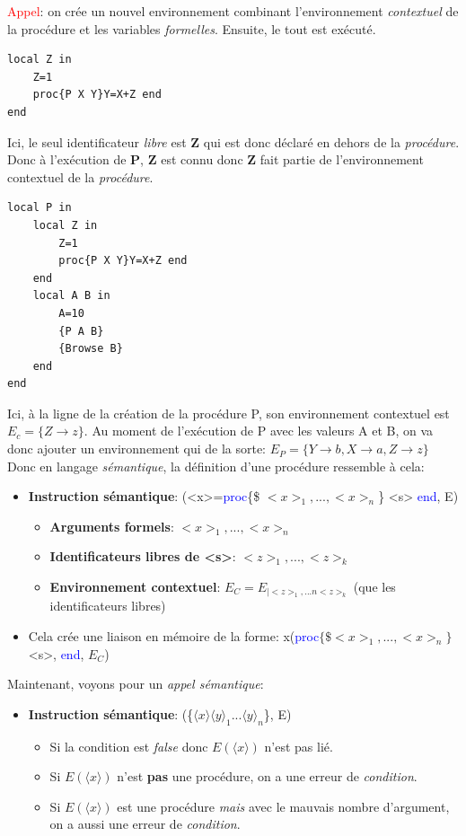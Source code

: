 \documentclass{report}
\begin{document}
\textcolor{red}{Appel}: on crée un nouvel environnement combinant l'environnement \textit{contextuel} de la procédure et les variables \textit{formelles}. Ensuite, le tout est exécuté.
\begin{lstlisting}
local Z in 
	Z=1
	proc{P X Y}Y=X+Z end
end
\end{lstlisting}
Ici, le seul identificateur \textit{libre} est \textbf{Z} qui est donc déclaré en dehors de la \textit{procédure}. Donc à l'exécution de \textbf{P}, \textbf{Z} est connu donc \textbf{Z} fait partie de l'environnement contextuel de la \textit{procédure}.
\begin{lstlisting}
local P in
	local Z in 
		Z=1
		proc{P X Y}Y=X+Z end
	end
	local A B in
		A=10
		{P A B}
		{Browse B}
	end
end 
\end{lstlisting}
Ici, à la ligne de la création de la procédure P, son environnement contextuel est $E_c = \{Z \rightarrow z\}$. Au moment de l'exécution de P avec les valeurs A et B, on va donc ajouter un environnement qui de la sorte: $E_P = \{Y \rightarrow b, X \rightarrow a, Z \rightarrow z\}$
Donc en langage \textit{sémantique}, la définition d'une procédure ressemble à cela:
\begin{itemize}
\item \textbf{Instruction sémantique}: (<x>=\textcolor{blue}{proc}\{\$ $<x>_1, ..., <x>_n$\} <s> \textcolor{blue}{end}, E)
\begin{itemize}
\item \textbf{Arguments formels}: $<x>_1, ..., <x>_n$
\item \textbf{Identificateurs libres de <s>}: $<z>_1, ..., <z>_k$
\item \textbf{Environnement contextuel}: $E_C = E_{|<z>_1, ...n <z>_k}$ (que les identificateurs libres)
\end{itemize}
\item Cela crée une liaison en mémoire de la forme: x(\textcolor{blue}{proc}$\{\$<x>_1, ..., <x>_n\}$<s>, \textcolor{blue}{end}, $E_C$)
\end{itemize}
Maintenant, voyons pour un \textit{appel sémantique}:
\begin{itemize}
\item \textbf{Instruction sémantique}: (\{$\langle x \rangle \langle y \rangle_1 ... \langle y \rangle_n$\}, E)
\begin{itemize}
\item Si la condition est \textit{false} donc $E(\langle x \rangle)$ n'est pas lié.
\item Si $E(\langle x \rangle)$ n'est \textbf{pas} une procédure, on a une erreur de \textit{condition}.
\item Si $E(\langle x \rangle)$ est une procédure \textit{mais} avec le mauvais nombre d'argument, on a aussi une erreur de \textit{condition}.
\end{itemize}
\end{itemize}
\end{document}
